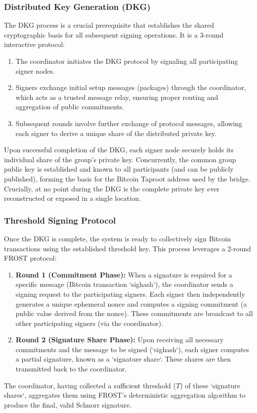 \documentclass{DESSThesis}
\begin{document}
\subsubsection{Distributed Key Generation (DKG)}
The DKG process is a crucial prerequisite that establishes the shared cryptographic basis for all subsequent signing operations. It is a 3-round interactive protocol:
\begin{enumerate}
    \item The coordinator initiates the DKG protocol by signaling all participating signer nodes.
    \item Signers exchange initial setup messages (packages) through the coordinator, which acts as a trusted message relay, ensuring proper routing and aggregation of public commitments.
    \item Subsequent rounds involve further exchange of protocol messages, allowing each signer to derive a unique share of the distributed private key.
\end{enumerate}
Upon successful completion of the DKG, each signer node securely holds its individual share of the group's private key. Concurrently, the common group public key is established and known to all participants (and can be publicly published), forming the basis for the Bitcoin Taproot address used by the bridge. Crucially, at no point during the DKG is the complete private key ever reconstructed or exposed in a single location.

\subsubsection{Threshold Signing Protocol}
Once the DKG is complete, the system is ready to collectively sign Bitcoin transactions using the established threshold key. This process leverages a 2-round FROST protocol:
\begin{enumerate}
    \item \textbf{Round 1 (Commitment Phase):} When a signature is required for a specific message (Bitcoin transaction `sighash`), the coordinator sends a signing request to the participating signers. Each signer then independently generates a unique ephemeral nonce and computes a signing commitment (a public value derived from the nonce). These commitments are broadcast to all other participating signers (via the coordinator).
    \item \textbf{Round 2 (Signature Share Phase):} Upon receiving all necessary commitments and the message to be signed (`sighash`), each signer computes a partial signature, known as a `signature share`. These shares are then transmitted back to the coordinator.
\end{enumerate}
The coordinator, having collected a sufficient threshold ($T$) of these `signature shares`, aggregates them using FROST's deterministic aggregation algorithm to produce the final, valid Schnorr signature.
\end{document}
